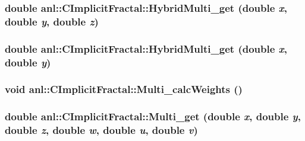 \label{classanl_1_1CImplicitFractal_a23dd9ce64676454bf0137400c035390e}
\hypertarget{classanl_1_1CImplicitFractal_a9d6007a8839ac746e862ef1bbc29c334}{
\subsubsection[{HybridMulti\_\-get}]{\setlength{\rightskip}{0pt plus 5cm}double anl::CImplicitFractal::HybridMulti\_\-get (double {\em x}, \/  double {\em y}, \/  double {\em z})}}
\label{classanl_1_1CImplicitFractal_a9d6007a8839ac746e862ef1bbc29c334}
\hypertarget{classanl_1_1CImplicitFractal_aae4e8956cd84e49194dac0424f2e74e8}{
\subsubsection[{HybridMulti\_\-get}]{\setlength{\rightskip}{0pt plus 5cm}double anl::CImplicitFractal::HybridMulti\_\-get (double {\em x}, \/  double {\em y})}}
\label{classanl_1_1CImplicitFractal_aae4e8956cd84e49194dac0424f2e74e8}
\hypertarget{classanl_1_1CImplicitFractal_ac52a77e29297d63001965aaeb8f4222b}{
\subsubsection[{Multi\_\-calcWeights}]{\setlength{\rightskip}{0pt plus 5cm}void anl::CImplicitFractal::Multi\_\-calcWeights ()}}
\label{classanl_1_1CImplicitFractal_ac52a77e29297d63001965aaeb8f4222b}
\hypertarget{classanl_1_1CImplicitFractal_a8f3a770fa04487a43358727073db6ad6}{
\subsubsection[{Multi\_\-get}]{\setlength{\rightskip}{0pt plus 5cm}double anl::CImplicitFractal::Multi\_\-get (double {\em x}, \/  double {\em y}, \/  double {\em z}, \/  double {\em w}, \/  double {\em u}, \/  double {\em v})}}
